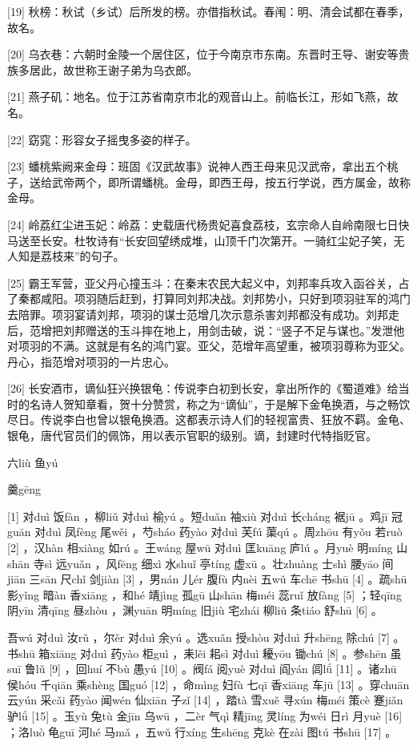 \documentclass[12pt,UTF8]{ctexbook}
\begin{document}
[19] 秋榜：秋试（乡试）后所发的榜。亦借指秋试。春闱：明、清会试都在春季，故名。

[20] 乌衣巷：六朝时金陵一个居住区，位于今南京市东南。东晋时王导、谢安等贵族多居此，故世称王谢子弟为乌衣郎。

[21] 燕子矶：地名。位于江苏省南京市北的观音山上。前临长江，形如飞燕，故名。

[22] 窈窕：形容女子摇曳多姿的样子。

[23] 蟠桃紫阙来金母：班固《汉武故事》说神人西王母来见汉武帝，拿出五个桃子，送给武帝两个，即所谓蟠桃。金母，即西王母，按五行学说，西方属金，故称金母。

[24] 岭荔红尘进玉妃：岭荔：史载唐代杨贵妃喜食荔枝，玄宗命人自岭南限七日快马送至长安。杜牧诗有“长安回望绣成堆，山顶千门次第开。一骑红尘妃子笑，无人知是荔枝来”的句子。

[25] 霸王军营，亚父丹心撞玉斗：在秦末农民大起义中，刘邦率兵攻入函谷关，占了秦都咸阳。项羽随后赶到，打算同刘邦决战。刘邦势小，只好到项羽驻军的鸿门去陪罪。项羽宴请刘邦，项羽的谋士范增几次示意杀害刘邦都没有成功。刘邦走后，范增把刘邦赠送的玉斗摔在地上，用剑击破，说：“竖子不足与谋也。”发泄他对项羽的不满。这就是有名的鸿门宴。亚父，范增年高望重，被项羽尊称为亚父。丹心，指范增对项羽的一片忠心。

[26] 长安酒市，谪仙狂兴换银龟：传说李白初到长安，拿出所作的《蜀道难》给当时的名诗人贺知章看，贺十分赞赏，称之为“谪仙”，于是解下金龟换酒，与之畅饮尽日。传说李白也曾以银龟换酒。这都表示诗人们的轻视富贵、狂放不羁。金龟、银龟，唐代官员们的佩饰，用以表示官职的级别。谪，封建时代特指贬官。





六liù 鱼yú


羹gēng





[1] 对duì 饭fàn ，柳liǔ 对duì 榆yú 。短duǎn 袖xiù 对duì 长cháng 裾jū 。鸡jī 冠guān 对duì 凤fèng 尾wěi ，芍sháo 药yào 对duì 芙fú 蕖qú 。周zhōu 有yǒu 若ruò [2] ，汉hàn 相xiàng 如rú 。王wáng 屋wū 对duì 匡kuāng 庐lú 。月yuè 明míng 山shān 寺sì 远yuǎn ，风fēng 细xì 水shuǐ 亭tíng 虚xū 。壮zhuàng 士shì 腰yāo 间jiān 三sān 尺chǐ 剑jiàn [3] ，男nán 儿ér 腹fù 内nèi 五wǔ 车chē 书shū [4] 。疏shū 影yǐng 暗àn 香xiāng ，和hé 靖jìng 孤gū 山shān 梅méi 蕊ruǐ 放fàng [5] ；轻qīng 阴yīn 清qīng 昼zhòu ，渊yuān 明míng 旧jiù 宅zhái 柳liǔ 条tiáo 舒shū [6] 。

吾wú 对duì 汝rǔ ，尔ěr 对duì 余yú 。选xuǎn 授shòu 对duì 升shēng 除chú [7] 。书shū 箱xiāng 对duì 药yào 柜guì ，耒lěi 耜sì 对duì 耰yōu 锄chú [8] 。参shēn 虽suī 鲁lǔ [9] ，回huí 不bù 愚yú [10] 。阀fá 阅yuè 对duì 阎yán 闾lǘ [11] 。诸zhū 侯hóu 千qiān 乘shèng 国guó [12] ，命mìng 妇fù 七qī 香xiāng 车jū [13] 。穿chuān 云yún 采cǎi 药yào 闻wén 仙xiān 子zǐ [14] ，踏tà 雪xuě 寻xún 梅méi 策cè 蹇jiǎn 驴lǘ [15] 。玉yù 兔tù 金jīn 乌wū ，二èr 气qì 精jīng 灵líng 为wéi 日rì 月yuè [16] ；洛luò 龟guī 河hé 马mǎ ，五wǔ 行xíng 生shēng 克kè 在zài 图tú 书shū [17] 。
\end{document}
